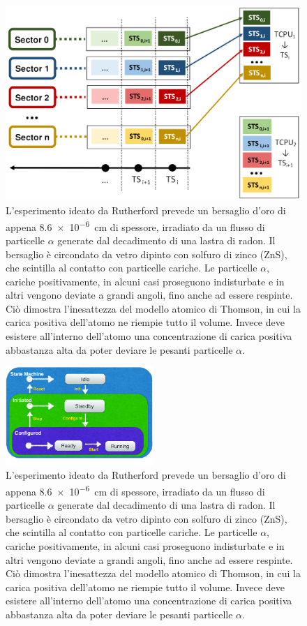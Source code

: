 \documentclass[../main.tex]{subfiles}
\begin{document}
\begin{figure}[tb]
    \centering
    \includegraphics[width=\textwidth]{hm_trasp.png}
    \caption{L'esperimento ideato da Rutherford prevede un bersaglio d'oro di appena \SI{8.6e-6}{\cm} di spessore, irradiato da un flusso di particelle $\alpha$ generate dal decadimento di una lastra di radon. Il bersaglio è circondato da vetro dipinto con solfuro di zinco (ZnS), che scintilla al contatto con particelle cariche. Le particelle $\alpha$, cariche positivamente, in alcuni casi proseguono indisturbate e in altri vengono deviate a grandi angoli, fino anche ad essere respinte. Ciò dimostra l'inesattezza del modello atomico di Thomson, in cui la carica positiva dell'atomo ne riempie tutto il volume. Invece deve esistere all'interno dell'atomo una concentrazione di carica positiva abbastanza alta da poter deviare le pesanti particelle $\alpha$. \cite{chiarusi}}
    \label{fig:hmtcpu}
\end{figure}


\begin{figure}[tb]
    \centering
    \includegraphics[width=0.5\textwidth]{tsc_scheme_color_better.png}
    \caption{L'esperimento ideato da Rutherford prevede un bersaglio d'oro di appena \SI{8.6e-6}{\cm} di spessore, irradiato da un flusso di particelle $\alpha$ generate dal decadimento di una lastra di radon. Il bersaglio è circondato da vetro dipinto con solfuro di zinco (ZnS), che scintilla al contatto con particelle cariche. Le particelle $\alpha$, cariche positivamente, in alcuni casi proseguono indisturbate e in altri vengono deviate a grandi angoli, fino anche ad essere respinte. Ciò dimostra l'inesattezza del modello atomico di Thomson, in cui la carica positiva dell'atomo ne riempie tutto il volume. Invece deve esistere all'interno dell'atomo una concentrazione di carica positiva abbastanza alta da poter deviare le pesanti particelle $\alpha$. \cite{chiarusi}}
    \label{fig:tsc}
\end{figure}
\end{document}
